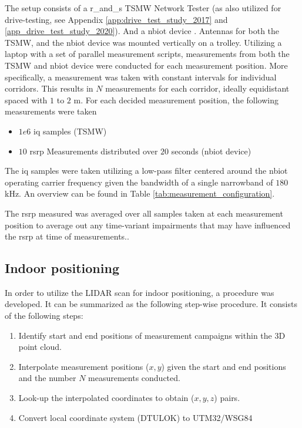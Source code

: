 The setup consists of a \gls{r_and_s} TSMW Network Tester \cite{Manual2017} (as also utilized for drive-testing, see Appendix \ref{app:drive_test_study_2017} and \ref{app_drive_test_study_2020}). And a \gls{nbiot} device \cite{sodaq}. Antennas for both the TSMW, and the \gls{nbiot} device was mounted vertically on a trolley. Utilizing a laptop with a set of parallel measurement scripts, measurements from both the TSMW and \gls{nbiot} device were conducted for each measurement position. More specifically, a measurement was taken with constant intervals for individual corridors. This results in $N$ measurements for each corridor, ideally equidistant spaced with $1$ to $2$ m. For each decided measurement position, the following measurements were taken

\begin{itemize}
    \item $1e6$ \gls{iq} samples (TSMW)
    \item $10$ \gls{rsrp} Measurements distributed over $20$ seconds (\gls{nbiot} device)
\end{itemize}


The \gls{iq} samples were taken utilizing a low-pass filter centered around the \gls{nbiot} operating carrier frequency given the bandwidth of a single narrowband of $180$ kHz. An overview can be found in Table \ref{tab:measurement_configuration}. 

The \gls{rsrp} measured was averaged over all samples taken at each measurement position to average out any time-variant impairments that may have influenced the \gls{rsrp} at time of measurements.. 



\subsection{Indoor positioning}
In order to utilize the LIDAR scan for indoor positioning, a procedure was developed. It can be summarized as the following step-wise procedure. It consists of the following steps:

\begin{enumerate}
    \item Identify start and end positions of measurement campaigns within the $3$D point cloud.
    \item Interpolate measurement positions ($x, y$) given the start and end positions and the number $N$ measurements conducted.
    \item Look-up the interpolated coordinates to obtain ($x, y, z$) pairs.
    \item Convert local coordinate system (DTULOK) to UTM32/WSG84
\end{enumerate}

